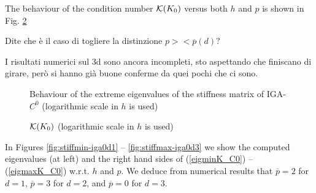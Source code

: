 \documentclass[11pt]{article}
\newcommand{\pg}{\color{red}}
\begin{document}
The behaviour of the condition number ${\cal K}(K_0)$ versus both $h$ and
$p$ is shown in Fig. \ref{fig:stiffcond-iga0}


{\pg Dite che \`e il caso di togliere la distinzione $p><\overline{p}(d)$?

I risultati numerici sul 3d sono ancora incompleti, sto aspettando che finiscano
di girare, per\`o si hanno gi\`a buone conferme da quei pochi che ci sono.}




\begin{figure}[h]
\begin{center}
\scalebox{0.5}{}\quad
\scalebox{0.5}{}\quad
\end{center}
\caption{Behaviour of the extreme eigenvalues of the stiffness
 matrix of IGA-$C^0$ (logarithmic scale in $h$ is used)}
\label{fig:stiff-iga0}
\end{figure}

\begin{figure}[h]
\begin{center}
\scalebox{0.5}{}\quad
\end{center}
\caption{${\cal K}(K_{0})$ (logarithmic scale in $h$ is used)}
\label{fig:stiffcond-iga0}
\end{figure}

In Figures \ref{fig:stiffmin-iga0d1} -- \ref{fig:stiffmax-iga0d3} we show
the computed eigenvalues (at left) and the right hand sides of
(\ref{eigminK_C0}) --
(\ref{eigmaxK_C0}) w.r.t. $h$ and $p$. We deduce from numerical results
that $\overline{p}=2$ for $d=1$, $\overline{p}=3$ for $d=2$, and
$\overline{p}=0$ for $d=3$.
\end{document}
